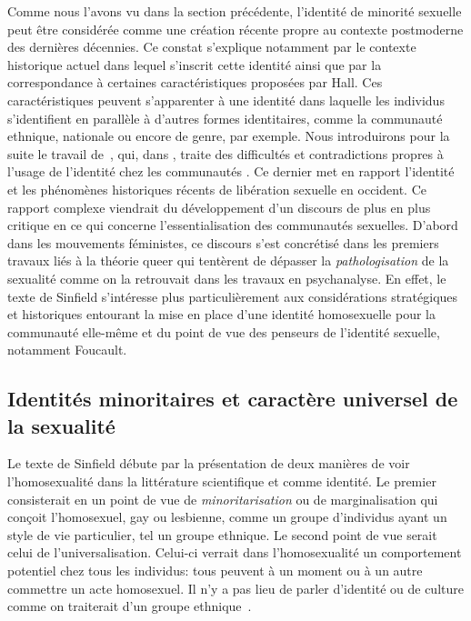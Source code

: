 Comme nous l'avons vu dans la section précédente, l'identité de minorité sexuelle peut être considérée comme une création récente propre au contexte postmoderne des dernières décennies.
Ce constat s'explique notamment par le contexte historique actuel dans lequel s'inscrit cette identité ainsi que par la correspondance à certaines caractéristiques proposées par Hall.
Ces caractéristiques peuvent s'apparenter à une identité dans laquelle les individus s'identifient en parallèle à d'autres formes identitaires, comme la communauté ethnique, nationale ou encore de genre, par exemple.
Nous introduirons pour la suite le travail de~\citet{Sinfield1996}, qui, dans , traite des difficultés et contradictions propres à l'usage de l'identité chez les communautés \lgbt{}.
Ce dernier met en rapport l'identité et les phénomènes historiques récents de libération sexuelle en occident.
Ce rapport complexe viendrait du développement d'un discours de plus en plus critique en ce qui concerne l'essentialisation des communautés sexuelles.
D'abord dans les mouvements féministes, ce discours s'est concrétisé dans les premiers travaux liés à la théorie queer qui tentèrent de dépasser la \emph{pathologisation} de la sexualité comme on la retrouvait dans les travaux en psychanalyse.
En effet, le texte de Sinfield s'intéresse plus particulièrement aux considérations stratégiques et historiques entourant la mise en place d'une identité homosexuelle pour la communauté elle-même et du point de vue des penseurs de l'identité sexuelle, notamment Foucault.

\subsection{Identités minoritaires et caractère universel de la sexualité}
\label{sub:minorit_s_et_universel}

Le texte de Sinfield débute par la présentation de deux manières de voir l'homosexualité dans la littérature scientifique et comme identité.
Le premier consisterait en un point de vue de \emph{minoritarisation} ou de marginalisation qui conçoit l'homosexuel, gay ou lesbienne, comme un groupe d'individus ayant un style de vie particulier, tel un groupe ethnique.
Le second point de vue serait celui de l'universalisation.
Celui-ci verrait dans l'homosexualité un comportement potentiel chez tous les individus: tous peuvent à un moment ou à un autre commettre un acte homosexuel.
Il n'y a pas lieu de parler d'identité ou de culture comme on traiterait d'un groupe ethnique~\citep[271]{Sinfield1996}.

